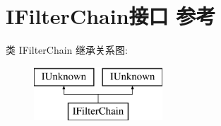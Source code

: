 \hypertarget{interface_i_filter_chain}{}\section{I\+Filter\+Chain接口 参考}
\label{interface_i_filter_chain}
类 I\+Filter\+Chain 继承关系图\+:\begin{figure}[H]
\begin{center}
\leavevmode
\includegraphics[height=2.000000cm]{interface_i_filter_chain}
\end{center}
\end{figure}
